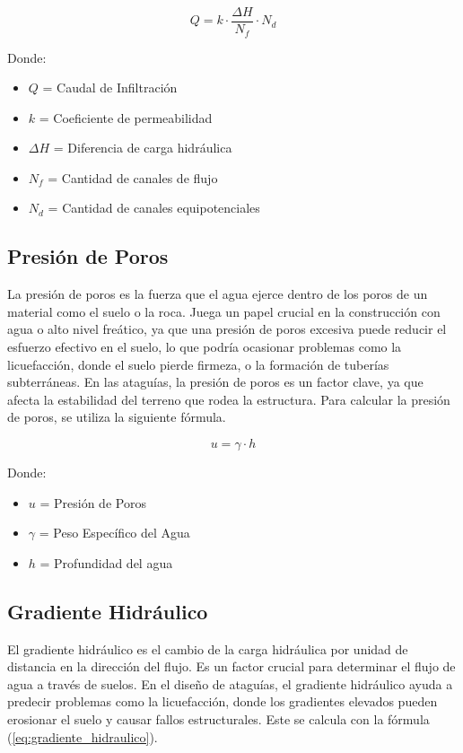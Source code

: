 \begin{equation}
    Q = k \cdot \frac{\Delta H}{N_{f}} \cdot N_{d}
    \label{eq:caudal_infiltracion}
\end{equation}

Donde:
\begin{itemize}
    \item $Q$ = Caudal de Infiltración
    \item $k$ = Coeficiente de permeabilidad
    \item $\Delta H$ = Diferencia de carga hidráulica
    \item $N_{f}$ = Cantidad de canales de flujo
    \item $N_{d}$ = Cantidad de canales equipotenciales
\end{itemize}

\subsection{Presión de Poros}
La presión de poros es la fuerza que el agua ejerce dentro de los poros de un material como el suelo o la roca. Juega un papel crucial en la construcción con agua o alto nivel freático, ya que una presión de poros excesiva puede reducir el esfuerzo efectivo en el suelo, lo que podría ocasionar problemas como la licuefacción, donde el suelo pierde firmeza, o la formación de tuberías subterráneas. En las ataguías, la presión de poros es un factor clave, ya que afecta la estabilidad del terreno que rodea la estructura. Para calcular la presión de poros, se utiliza la siguiente fórmula. \textbf{\cite{jeas}}

\begin{equation}
    u = \gamma \cdot h
    \label{eq:presion_poros}
\end{equation}

Donde:
\begin{itemize}
    \item $u$ = Presión de Poros
    \item $\gamma$ = Peso Específico del Agua
    \item $h$ = Profundidad del agua
\end{itemize}

\subsection{Gradiente Hidráulico}
El gradiente hidráulico es el cambio de la carga hidráulica por unidad de distancia en la dirección del flujo. Es un factor crucial para determinar el flujo de agua a través de suelos. En el diseño de ataguías, el gradiente hidráulico ayuda a predecir problemas como la licuefacción, donde los gradientes elevados pueden erosionar el suelo y causar fallos estructurales. Este se calcula con la fórmula (\ref{eq:gradiente_hidraulico}). \textbf{\cite{budhu_soil_2010}}

